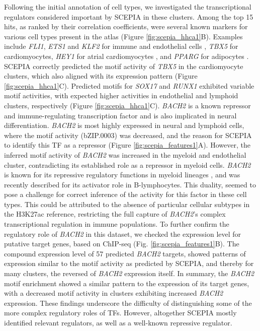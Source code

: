 \vspace{\baselineskip}

Following the initial annotation of cell types, we investigated the transcriptional regulators considered important by SCEPIA in these clusters. Among the top 15 hits, as ranked by their correlation coefficients, were several known markers for various cell types present in the atlas (Figure \ref{fig:scepia_hhca1}B). Examples include \textit{FLI1}, \textit{ETS1} and \textit{KLF2} for immune and endothelial cells \cite{Meadows2009,Zhao2018,BenDavid2022}, \textit{TBX5} for cardiomyocytes\cite{Steimle2017,Siatra2023}, \textit{HEY1} for atrial cardiomyocytes \cite{Kokubo2007}, and \textit{PPARG} for adipocytes \cite{Ma2018}. SCEPIA correctly predicted the motif activity of \textit{TBX5} in the cardiomyocyte clusters, which also aligned with its expression pattern (Figure \ref{fig:scepia_hhca1}C). Predicted motifs for \textit{SOX17} and \textit{RUNX1} exhibited variable motif activities, with expected higher activities in endothelial and lymphoid clusters, respectively (Figure \ref{fig:scepia_hhca1}C)\cite{Lee2014,Schachterle2017,Sood2017}. \textit{BACH2} is a known repressor and immune-regulating transcription factor and is also implicated in neural differentiation\cite{Hoshino2002,Liu2022}. \textit{BACH2} is most highly expressed in neural and lymphoid cells, where the motif activity (bZIP.0003) was decreased, and the reason for SCEPIA to identify this TF as a repressor (Figure \ref{fig:scepia_features1}A). However, the inferred motif activity of \textit{BACH2} was increased in the myeloid and endothelial cluster, contradicting its established role as a repressor in myeloid cells. \textit{BACH2} is known for its repressive regulatory functions in myeloid lineages \cite{ItohNakadai2014}, and was recently described for its activator role in B-lymphocytes\cite{Ochiai2022}. This duality, seemed to pose a challenge for correct inference of the activity for this factor in these cell types. This could be attributed to the absence of particular cellular subtypes in the H3K27ac reference, restricting the full capture of \textit{BACH2}'s complex transcriptional regulation in immune populations. To further confirm the regulatory role of \textit{BACH2} in this dataset, we checked the expression level for putative target genes, based on ChIP-seq (Fig. \ref{fig:scepia_features1}B). The compound expression level of 57 predicted \textit{BACH2} targets, showed patterns of expression similar to the motif activity as predicted by SCEPIA, and thereby for many clusters, the reversed of \textit{BACH2} expression itself. In summary, the \textit{BACH2} motif enrichment showed a similar pattern to the expression of its target genes, with a decreased motif activity in clusters exhibiting increased \textit{BACH2} expression. These findings underscore the difficulty of distinguishing some of the more complex regulatory roles of TFs. However, altogether SCEPIA mostly identified relevant regulators, as well as a well-known repressive regulator.

